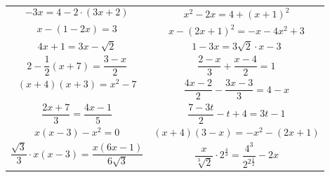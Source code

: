 \documentclass[a4paper,12pt,leqno,fleqn]{article}
\begin{document}
\begin{tabularx}{\linewidth}{@{}XX@{}}

  \begin{equation}
    -3x=4-2\cdot(3x+2)
  \end{equation}
&
  \begin{equation}
    x^2-2x=4+(x+1)^2
  \end{equation}
\\
  \begin{equation}
    x-(1-2x)=3
  \end{equation}
&
  \begin{equation}
    x-(2x+1)^2=-x-4x^2+3
  \end{equation}
\\
  \begin{equation}
    4x+1=3x-\sqrt{2}
  \end{equation}
&
  \begin{equation}
    1-3x=3\sqrt{2}\cdot x-3
  \end{equation}
\\
  \begin{equation}
    2-\frac{1}{2}(x+7)=\frac{3-x}{2}
  \end{equation}
&
  \begin{equation}
    \frac{2-x}{3}+\frac{x-4}{2}=1
  \end{equation}
\\
  \begin{equation}
    (x+4)(x+3)=x^2-7
  \end{equation}
&
  \begin{equation}
    \frac{4x-2}{2}-\frac{3x-3}{3}=4-x
  \end{equation}
\\
  \begin{equation}
    \frac{2x+7}{3}=\frac{4x-1}{5}
  \end{equation}
&
  \begin{equation}
    \frac{7-3t}{2}-t+4=3t-1
  \end{equation}
\\
  \begin{equation}
    x(x-3)-x^2=0
  \end{equation}
&
  \begin{equation}
    (x+4)(3-x)=-x^2-(2x+1)
  \end{equation}
\\
  \begin{equation}
    \frac{\sqrt{3}}{3}\cdot x(x-3)=\frac{x(6x-1)}{6\sqrt{3}}
  \end{equation}
&
  \begin{equation}
    \frac{x}{\sqrt[3]{2}}\cdot 2^{\frac{4}{3}}=\frac{4^{3}}{2^{2\frac{1}{2}}}-2x
  \end{equation}
\\
\end{tabularx}
\end{document}
